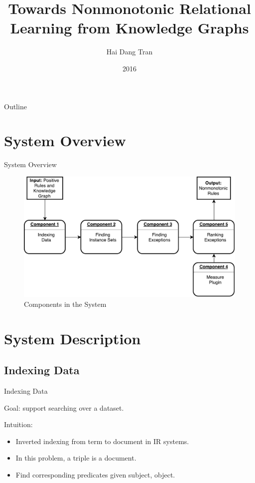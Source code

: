 \documentclass{beamer}
\title{Towards Nonmonotonic Relational Learning from Knowledge Graphs}
\subtitle{}
\author{Hai Dang Tran\inst{1}}
\institute[Max Planck Institute for Informatics] %
{
  \inst{1}%
  Saarland University\\
  Max Planck Institute for Informatics
}
\date{2016}
\begin{document}
\begin{frame}
  \titlepage
\end{frame}

\begin{frame}{Outline}
  \tableofcontents
\end{frame}

\section{System Overview}

\begin{frame}{System Overview}

\begin{figure}[h]
	\centering
	\includegraphics[page=1,width=.95\textwidth]{overview.pdf}
	\caption{Components in the System}
\end{figure}

\end{frame}

\section{System Description}

\subsection{Indexing Data}

\begin{frame}{Indexing Data}

Goal: support searching over a dataset.

Intuition:
\begin{itemize}
	\item Inverted indexing from term to document in IR systems.
  	\item In this problem, a triple is a document.
  	\item Find corresponding predicates given subject, object.
\end{itemize}

\end{frame}
\end{document}
